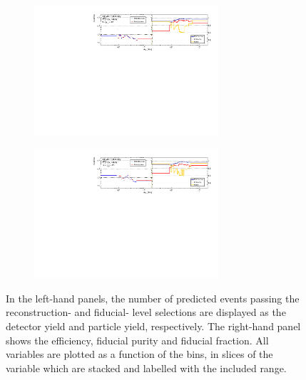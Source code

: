 \begin{figure}[htb]
\begin{subfigure}{.99\textwidth}
    \end{subfigure}
    \begin{subfigure}{.99\textwidth}\centering
      \includegraphics[width = 0.75\textwidth]{Figures/m4l/UnfoldingStudies/v014_inputs/m4l_y4l9-12inputs.pdf}
    \end{subfigure}
    \begin{subfigure}{.99\textwidth}\centering
      \includegraphics[width = 0.75\textwidth]{Figures/m4l/UnfoldingStudies/v014_inputs/m4l_y4l12-25inputs.pdf}
    \end{subfigure}
    \caption{In the left-hand panels, the number of predicted events passing the reconstruction- and fiducial- level selections are displayed as the detector yield and particle yield, respectively. The right-hand panel shows the efficiency, fiducial purity and fiducial fraction. All variables are plotted as a function of the \mFourL bins, in slices of the \yFourL variable which are stacked and labelled with the included \yFourL range.
    \label{fig:y4lunf}}
\end{figure}  

\FloatBarrier
\clearpage

